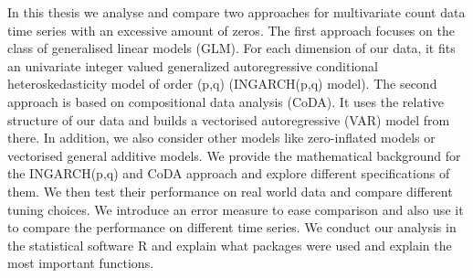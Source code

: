In this thesis we analyse and compare two approaches for multivariate count data time series with an excessive amount of zeros. The first approach focuses on the class of generalised linear models (GLM). For each dimension of our data, it fits an univariate integer valued generalized autoregressive conditional heteroskedasticity model of order (p,q) (INGARCH(p,q) model). The second approach is based on compositional data analysis (CoDA). It uses the relative structure of our data and builds a vectorised autoregressive (VAR) model from there. In addition, we also consider other models like zero-inflated models or vectorised general additive models. We provide the mathematical background for the INGARCH(p,q) and CoDA approach and explore different specifications of them. We then test their performance on real world data and compare different tuning choices. We introduce an error measure to ease comparison and also use it to compare the performance on different time series. We conduct our analysis in the statistical software R and explain what packages were used and explain the most important functions.  